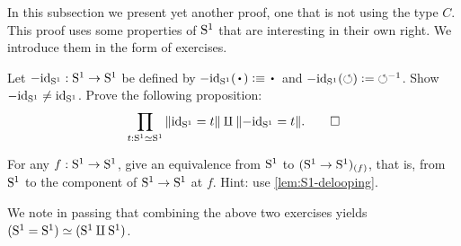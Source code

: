 In this subsection we present yet another proof, one that is not using the type $C$.
This proof uses some properties of ${\mathrm{S}^1}$ that are interesting in their own right.
We introduce them in the form of exercises.

\begin{xca}\label{xca:S1=S1-components}
Let $-\mathord{\mathrm{id}}_{\mathrm{S}^1} : {\mathrm{S}^1}\to{\mathrm{S}^1}$ be defined by $-\id_\Sc(\base)\defeq\base$
and $-\mathord{\mathrm{id}}_{\mathrm{S}^1}(\circlearrowleft)\mathrel{\vcentcolon=}{\circlearrowleft}^{-1}$. Show $-\mathord{\mathrm{id}}_{\mathrm{S}^1} \neq \mathord{\mathrm{id}}_{\mathrm{S}^1}$.
Prove the following proposition:
\[
\prod_{t:{\mathrm{S}^1}\simeq{\mathrm{S}^1}}{\lVert\mathord{\mathrm{id}}_{\mathrm{S}^1} = t\rVert\amalg \lVert-\mathord{\mathrm{id}}_{\mathrm{S}^1} = t\rVert}.\qedhere
\]
\end{xca}

\begin{xca}\label{xca:(S1->S1)_(f)-eqv-S1}
For any $f: {\mathrm{S}^1}\to{\mathrm{S}^1}$, give an equivalence
from ${\mathrm{S}^1}$ to $({\mathrm{S}^1}\to{\mathrm{S}^1})_{(f)}$, that is, from ${\mathrm{S}^1}$ to
the component of ${\mathrm{S}^1}\to{\mathrm{S}^1}$ at $f$.
Hint: use \cref{lem:S1-delooping}.
\end{xca}

We note in passing that combining the above two exercises
yields $({\mathrm{S}^1}={\mathrm{S}^1})\simeq({\mathrm{S}^1}\amalg{\mathrm{S}^1})$.

